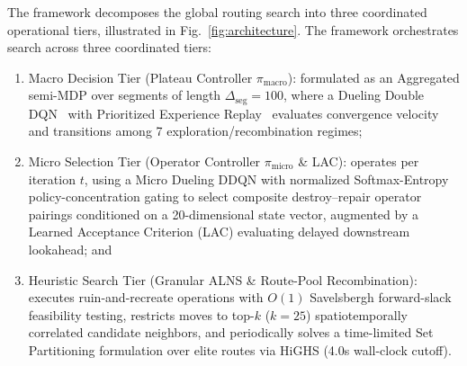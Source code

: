\documentclass{ieeeaccess}
\begin{document}
The framework decomposes the global routing search into three coordinated operational tiers, illustrated in Fig.~\ref{fig:architecture}. The framework orchestrates search across three coordinated tiers:
\begin{enumerate}
    \item Macro Decision Tier (Plateau Controller $\pi_{\text{macro}}$): formulated as an Aggregated semi-MDP over segments of length $\Delta_{\text{seg}} = 100$, where a Dueling Double DQN~\cite{mnih2015human,vanhasselt2016deep} with Prioritized Experience Replay~\cite{schaul2016prioritized} evaluates convergence velocity and transitions among 7 exploration/recombination regimes;
    \item Micro Selection Tier (Operator Controller $\pi_{\text{micro}}$ \& LAC): operates per iteration $t$, using a Micro Dueling DDQN with normalized Softmax-Entropy policy-concentration gating to select composite destroy--repair operator pairings conditioned on a 20-dimensional state vector, augmented by a Learned Acceptance Criterion (LAC) evaluating delayed downstream lookahead; and
    \item Heuristic Search Tier (Granular ALNS \& Route-Pool Recombination): executes ruin-and-recreate operations with $O(1)$ Savelsbergh forward-slack feasibility testing, restricts moves to top-$k$ ($k=25$) spatiotemporally correlated candidate neighbors, and periodically solves a time-limited Set Partitioning formulation over elite routes via HiGHS (4.0s wall-clock cutoff).
\end{enumerate}
\end{document}
